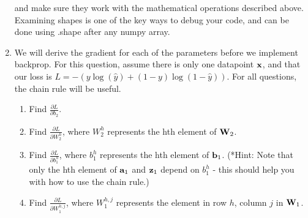 \documentclass[submit]{harvardml}
\begin{document}
\begin{problem}[Backprop]
\begin{enumerate}
      and make sure they work with the mathematical operations described above. Examining shapes is one of the key ways to debug your code, and can be done using .shape after any numpy array.
      
    \item  We will derive the gradient for each of the parameters before we implement backprop. For this question, assume there is only one datapoint $\bold{x}$, and that our loss is $L = -(y \log (\hat{y}) + (1 - y) \log (1 - \hat{y}))$. For all questions, the chain rule will be useful.
    \begin{enumerate}
        \item Find $\frac{\partial L}{\partial b_2}$. 
        
        \item Find $\frac{\partial L}{\partial W_2^h}$, where $W_2^h$ represents the hth element of $\bold{W}_2$.
        
        \item Find $\frac{\partial L}{\partial b_1^h}$, where $b_1^h$ represents the hth element of $\bold{b}_1$. (*Hint: Note that only the hth element of $\bold{a}_1$ and $\bold{z}_1$ depend on $b_1^h$ - this should help you with how to use the chain rule.)
        
        \item Find $\frac{\partial L}{\partial W_1^{h,j}}$, where  $W_1^{h,j}$ represents the element in row $h$, column $j$ in $\bold{W}_1$.
    
    \end{enumerate}
    \end{enumerate}
    
    \end{problem}
    \setcounter{problem}{1}
\end{document}
